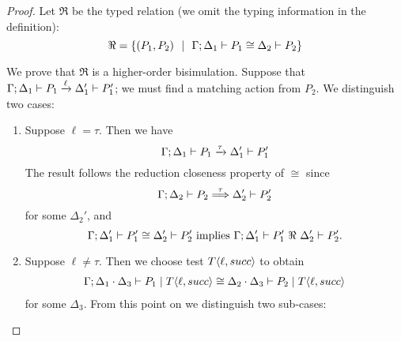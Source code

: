 \begin{proof}
	\noi Let $\Re$ be the typed relation (we omit the typing information in the definition):
	\[
		\Re = \{(P_1, P_2) \ \ |\ \  \Gamma; \Delta_1 \vdash P_1 \cong \Delta_2 \vdash P_2\}
	\]

	We prove that $\Re$ is a higher-order bisimulation. 
	Suppose that 
	$\Gamma; \Delta_1 \vdash P_1 \xrightarrow{\ell} \Delta_1' \vdash P_1'$; we must find a matching action from $P_2$.
	We distinguish two cases:
\begin{enumerate}[1.]
	\item Suppose $\ell = \tau$. Then we have
			\[
				\Gamma; \Delta_1 \vdash P_1 \xrightarrow{\tau} \Delta_1' \vdash P_1'
			\]
			\noi The result follows the reduction closeness property of $\cong$ since
			\[
				\Gamma; \Delta_2 \vdash P_2 \stackrel{\tau}{\Longrightarrow} \Delta_2' \vdash P_2'
			\]
			for some $\Delta_2'$, and
			\[
				\horel{\Gamma}{\Delta_1'}{P_1'}{\cong}{\Delta_2'}{P_2'} \text{ implies } \horel{\Gamma}{\Delta_1'}{P_1'}{\ \Re\ }{\Delta_2'}{P_2'}.
			\]

	\item Suppose $\ell \neq \tau$. Then we choose test $T\langle \ell, succ \rangle$ to obtain
			\begin{eqnarray}
				\Gamma; \Delta_1 \cdot \Delta_3 \vdash P_1 \;|\; T\langle \ell, succ \rangle \cong \Delta_2 \cdot \Delta_3 \vdash P_2 \;|\; T\langle \ell, succ \rangle
				\label{lem:cong_is_wb2}
			\end{eqnarray}
			for some $\Delta_3$.
			\noi From this point on we distinguish two sub-cases:


\end{enumerate}
\end{proof}
